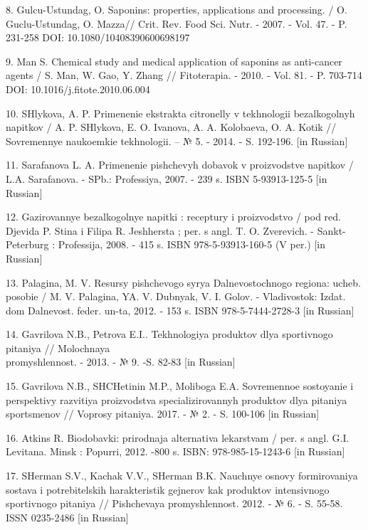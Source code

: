 \begin{noparindent}
8. Gulcu-Ustundag, O. Saponins: properties, applications and processing.
/ O. Guclu-Ustundag, O. Mazza// Crit. Rev. Food Sci. Nutr. - 2007. -
Vol. 47. - P. 231-258 DOI: 10.1080/10408390600698197

9. Man S. Chemical study and medical application of saponins as
anti-cancer agents / S. Man, W. Gao, Y. Zhang // Fitoterapia. - 2010. -
Vol. 81. - P. 703-714 DOI: 10.1016/j.fitote.2010.06.004

10. SHlykova, A. P. Primenenie ekstrakta citronelly v tekhnologii
bezalkogol\textquotesingle nyh napitkov / A. P. SHlykova, E. O. Ivanova,
A. A. Kolobaeva, O. A. Kotik // Sovremennye naukoemkie tekhnologii. -- №
5. - 2014. - S. 192-196. {[}in Russian{]}

11. Sarafanova L. A. Primenenie pishchevyh dobavok v proizvodstve
napitkov / L.A. Sarafanova. - SPb.: Professiya, 2007. - 239 s. ISBN
5-93913-125-5 {[}in Russian{]}

12. Gazirovannye bezalkogol\textquotesingle nye napitki : receptury i
proizvodstvo / pod red. Djevida P. Stina i Filipa R. Jeshhersta ; per. s
angl. T. O. Zverevich. - Sankt-Peterburg : Professija, 2008. - 415 s.
ISBN 978-5-93913-160-5 (V per.) {[}in Russian{]}

13. Palagina, M. V. Resursy pishchevogo syr\textquotesingle ya
Dal\textquotesingle nevostochnogo regiona: ucheb. posobie / M. V.
Palagina, YA. V. Dubnyak, V. I. Golov. - Vladivostok: Izdat. dom
Dal\textquotesingle nevost. feder. un-ta, 2012. - 153 s. ISBN
978-5-7444-2728-3 {[}in Russian{]}

14. Gavrilova N.B., Petrova E.I.. Tekhnologiya produktov dlya
sportivnogo pitaniya // Molochnaya \\promyshlennost\textquotesingle. -
2013. - № 9. -S. 82-83 {[}in Russian{]}

15. Gavrilova N.B., SHCHetinin M.P., Moliboga E.A. Sovremennoe
sostoyanie i perspektivy razvitiya proizvodstva specializirovannyh
produktov dlya pitaniya sportsmenov // Voprosy pitaniya. 2017. - № 2. -
S. 100-106 {[}in Russian{]}

16. Atkins R. Biodobavki: prirodnaja al\textquotesingle ternativa
lekarstvam / per. s angl. G.I. Levitana. Minsk : Popurri, 2012. -800 s.
ISBN: 978-985-15-1243-6 {[}in Russian{]}

17. SHerman S.V., Kachak V.V., SHerman B.K. Nauchnye osnovy
formirovaniya sostava i potrebitel\textquotesingle skih harakteristik
gejnerov kak produktov intensivnogo sportivnogo pitaniya // Pishchevaya
promyshlennost\textquotesingle. 2012. - № 6. - S. 55-58. ISSN 0235-2486
{[}in Russian{]}


\end{noparindent}
